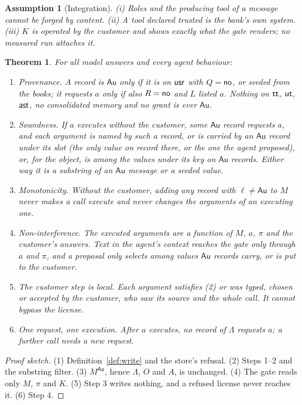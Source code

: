 \documentclass[10pt]{article}
\newtheorem{assumption}{Assumption}
\newtheorem{theorem}{Theorem}
\newcommand{\Au}{\mathsf{Au}}\newcommand{\At}{\mathsf{At}}\newcommand{\Un}{\mathsf{Un}}
\begin{document}
\begin{assumption}[Integration]\label{as:int}
(i) Roles and the producing tool of a message cannot be forged by content. (ii) A tool declared
trusted is the bank's own system. (iii) $K$ is operated by the customer and shows exactly what the
gate renders; no measured run attaches it.
\end{assumption}

\begin{theorem} For all model answers and every agent behaviour:
\begin{enumerate}
\item \emph{Provenance.} A record is $\Au$ only if it is on $\mathsf{usr}$ with $Q = \textsf{no}$, or seeded from the
  books; it requests $a$ only if also $R = \textsf{no}$ and $L$ listed $a$. Nothing on $\mathsf{tt}$, $\mathsf{ut}$, $\mathsf{ast}$,
  no consolidated memory and no grant is ever $\Au$.
\item \emph{Soundness.} If $a$ executes without the customer, some $\Au$ record requests $a$, and
  each argument is named by such a record, or is carried by an $\Au$ record under its slot (the
  only value on record there, or the one the agent proposed), or, for the object, is among the
  values under its key on $\Au$ records. Either way it is a substring of an $\Au$ message or a
  seeded value.
\item \emph{Monotonicity.} Without the customer, adding any record with $\ell \neq \Au$ to $M$
  never makes a call execute and never changes the arguments of an executing one.
\item \emph{Non-interference.} The executed arguments are a function of $M$, $a$, $\pi$ and the
  customer's answers. Text in the agent's context reaches the gate only through $a$ and $\pi$,
  and a proposal only selects among values $\Au$ records carry, or is put to the customer.
\item \emph{The customer step is local.} Each argument satisfies (2) or was typed, chosen or
  accepted by the customer, who saw its source and the whole call. It cannot bypass the license.
\item \emph{One request, one execution.} After $a$ executes, no record of $\Lambda$ requests $a$; a
  further call needs a new request.
\end{enumerate}
\end{theorem}
\begin{proof}[Proof sketch]
(1) Definition~\ref{def:write} and the store's refusal. (2) Steps 1--2 and the substring filter.
(3) $M^{\Au}$, hence $\Lambda$, $O$ and $A$, is unchanged. (4) The gate reads only $M$, $\pi$ and $K$.
(5) Step 3 writes nothing, and a refused license never reaches it. (6) Step 4.
\end{proof}
\end{document}
